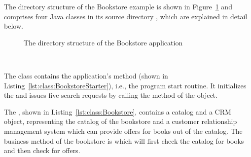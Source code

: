 The directory structure of the Bookstore example is shown in Figure~\ref{fig:PlainBookstoreExample} and comprises four Java classes in its source directory , which are explained in detail below.

\begin{figure}[H]
\begin{graybox}
\end{graybox}

\caption{The directory structure of the Bookstore application}
\label{fig:PlainBookstoreExample}
\end{figure}


\quad\

\enlargethispage{1cm}

\noindent The class  contains the application's  method (shown in Listing~\ref{lst:class:BookstoreStarter}), i.e., the program start routine. It initializes the  and issues five search requests by calling the  method of the  object.

\medskip

\setJavaCodeListing


\pagebreak

\noindent The , shown in Listing~\ref{lst:class:Bookstore}, contains a catalog and a CRM object, representing the catalog of the bookstore and a customer relationship management system which can provide offers for books out of the catalog. The business method of the bookstore is  which will first check the catalog for books and then check for offers.

